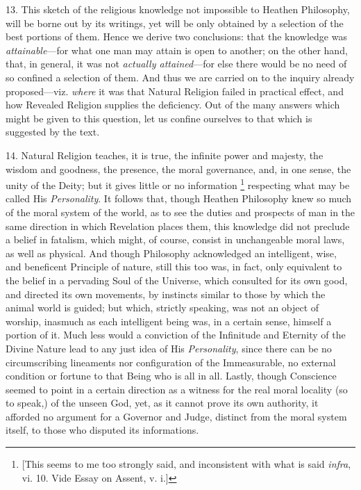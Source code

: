 13. This sketch of the religious knowledge not impossible to
Heathen Philosophy, will be borne out by its writings, yet will be
only obtained by a selection of the best portions of them. Hence we
derive two conclusions: that the knowledge was \emph{attainable}—for
what one man may attain is open to another; on the other hand, that,
in general, it was not \emph{actually attained}—for else there would
be no need of so confined a selection of them. And thus we are carried
on to the inquiry already proposed—viz. \emph{where} it was that
Natural Religion failed in practical effect, and how Revealed Religion
supplies the deficiency. Out of the many answers which might be given
to this question, let us confine ourselves to that which is suggested
by the text.

14. Natural Religion teaches, it is true, the infinite power and
majesty, the wisdom and goodness, the presence, the moral governance,
and, in one sense, the unity of the Deity; but it gives little or no
information \footnote{[This seems to me too strongly said, and inconsistent with what
is said \emph{infra}, vi. 10. Vide Essay on Assent, v. i.]} respecting
what may be called His \emph{Personality}. It follows that, though
Heathen Philosophy knew so much of the moral system of the world, as
to see the duties and prospects of man in the same direction in which
Revelation places them, this knowledge did not preclude a belief in
fatalism, which might, of course, consist in unchangeable moral laws,
as well as physical. And though Philosophy acknowledged an
intelligent, wise, and beneficent Principle of nature, still this too
was, in fact, only equivalent to the belief in a pervading Soul of the
Universe, which consulted for its own good, and directed its own
movements, by instincts similar to those by which the animal world is
guided; but which, strictly speaking, was not an object of worship,
inasmuch as each intelligent being was, in a certain sense, himself a
portion of it. Much less would a conviction of the Infinitude and
Eternity of the Divine Nature lead to any just idea of His \emph{Personality},
since there can be no circumscribing lineaments nor configuration of
the Immeasurable, no external condition or fortune to that Being who
is all in all. Lastly, though Conscience seemed to point in a certain
direction as a witness for the real moral locality (so to speak,) of
the unseen God, yet, as it cannot prove its own authority, it afforded
no argument for a Governor and Judge, distinct from the moral system
itself, to those who disputed its informations.


